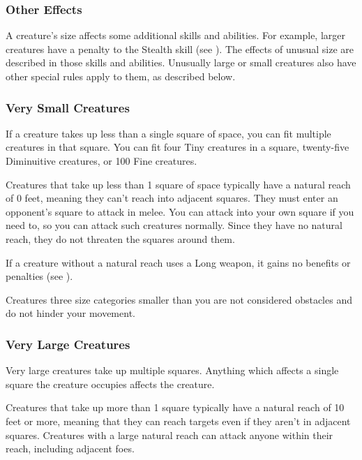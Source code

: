         \subsubsection{Other Effects}
            A creature's size affects some additional skills and abilities.
            For example, larger creatures have a penalty to the Stealth skill (see ).
            The effects of unusual size are described in those skills and abilities.
            Unusually large or small creatures also have other special rules apply to them, as described below.

        \subsubsection{Very Small Creatures}
             If a creature takes up less than a single square of space, you can fit multiple creatures in that square. You can fit four Tiny creatures in a square, twenty-five Diminuitive creatures, or 100 Fine creatures.

             Creatures that take up less than 1 square of space typically have a natural reach of 0 feet, meaning they can't reach into adjacent squares. They must enter an opponent's square to attack in melee. You can attack into your own square if you need to, so you can attack such creatures normally. Since they have no natural reach, they do not threaten the squares around them.

            If a creature without a natural reach uses a Long weapon, it gains no benefits or penalties (see ).

             Creatures three size categories smaller than you are not considered obstacles and do not hinder your movement.

        \subsubsection{Very Large Creatures}
             Very large creatures take up multiple squares. Anything which affects a single square the creature occupies affects the creature.

             Creatures that take up more than 1 square typically have a natural reach of 10 feet or more, meaning that they can reach targets even if they aren't in adjacent squares. Creatures with a large natural reach can attack anyone within their reach, including adjacent foes.

